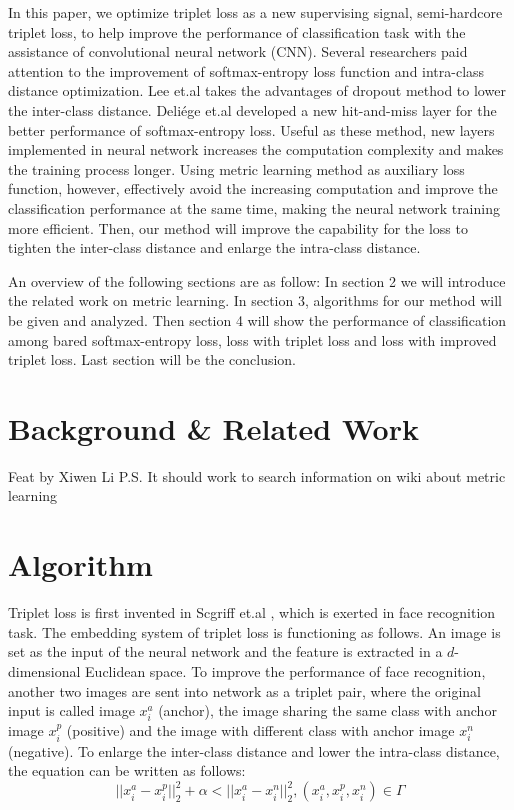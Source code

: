 \documentclass[10pt,twocolumn,letterpaper]{article}
\begin{document}
In this paper, we optimize triplet loss as a new supervising signal, semi-hardcore triplet loss, to help improve the performance of classification task with the assistance of convolutional neural network (CNN). Several researchers paid attention to the improvement of softmax-entropy loss function and intra-class distance optimization. Lee et.al \cite{lee2018dropmax} takes the advantages of dropout method to lower the inter-class distance. Deli{\'e}ge et.al \cite{deliege2018hitnet} developed a new hit-and-miss layer for the better performance of softmax-entropy loss. Useful as these method, new layers implemented in neural network increases the computation complexity and makes the training process longer. Using metric learning method as auxiliary loss function, however, effectively avoid the increasing computation and improve the classification performance at the same time, making the neural network training more efficient. Then, our method will improve the capability for the loss to tighten the inter-class distance and enlarge the intra-class distance.

An overview of the following sections are as follow: In section 2 we will introduce the related work on metric learning. In section 3, algorithms for our method will be given and analyzed. Then section 4 will show the performance of classification among bared softmax-entropy loss, loss with triplet loss and loss with improved triplet loss. Last section will be the conclusion.



\section{Background \& Related Work}
Feat by Xiwen Li
P.S. It should work to search information on wiki about metric learning

\section{Algorithm}
Triplet loss is first invented in Scgriff et.al \cite{schroff2015facenet}, which is exerted in face recognition task. The embedding system of triplet loss is functioning as follows. An image is set as the input of the neural network and the feature is extracted in a $d$-dimensional Euclidean space. To improve the performance of face recognition, another two images are sent into network as a triplet pair, where the original input is called image $x_i^a$ (anchor), the image sharing the same class with anchor image $x_i^p$ (positive) and the image with different class with anchor image $x_i^n$ (negative). To enlarge the inter-class distance and lower the intra-class distance, the equation can be written as follows:
$$||x_i^a - x_i^p||_2^2 + \alpha < ||x_i^a - x_i^n||_2^2, (x_i^a, x_i^p, x_i^n) \in \Gamma$$
\end{document}
